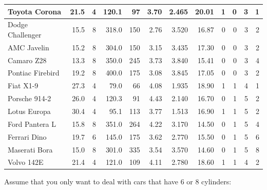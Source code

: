 \documentclass[
]{book}
\newenvironment{Shaded}{\begin{snugshade}}{\end{snugshade}}
\newcommand{\DecValTok}[1]{\textcolor[rgb]{0.00,0.00,0.81}{#1}}
\newcommand{\FunctionTok}[1]{\textcolor[rgb]{0.00,0.00,0.00}{#1}}
\newcommand{\NormalTok}[1]{#1}
\newcommand{\OtherTok}[1]{\textcolor[rgb]{0.56,0.35,0.01}{#1}}
\newcommand{\SpecialCharTok}[1]{\textcolor[rgb]{0.00,0.00,0.00}{#1}}
\theoremstyle{definition}
\theoremstyle{definition}
\theoremstyle{definition}
\theoremstyle{definition}
\theoremstyle{remark}
\begin{document}
\begin{tabular}{l|r|r|r|r|r|r|r|r|r|r|r}
\hline
Toyota Corona & 21.5 & 4 & 120.1 & 97 & 3.70 & 2.465 & 20.01 & 1 & 0 & 3 & 1\\
\hline
Dodge Challenger & 15.5 & 8 & 318.0 & 150 & 2.76 & 3.520 & 16.87 & 0 & 0 & 3 & 2\\
\hline
AMC Javelin & 15.2 & 8 & 304.0 & 150 & 3.15 & 3.435 & 17.30 & 0 & 0 & 3 & 2\\
\hline
Camaro Z28 & 13.3 & 8 & 350.0 & 245 & 3.73 & 3.840 & 15.41 & 0 & 0 & 3 & 4\\
\hline
Pontiac Firebird & 19.2 & 8 & 400.0 & 175 & 3.08 & 3.845 & 17.05 & 0 & 0 & 3 & 2\\
\hline
Fiat X1-9 & 27.3 & 4 & 79.0 & 66 & 4.08 & 1.935 & 18.90 & 1 & 1 & 4 & 1\\
\hline
Porsche 914-2 & 26.0 & 4 & 120.3 & 91 & 4.43 & 2.140 & 16.70 & 0 & 1 & 5 & 2\\
\hline
Lotus Europa & 30.4 & 4 & 95.1 & 113 & 3.77 & 1.513 & 16.90 & 1 & 1 & 5 & 2\\
\hline
Ford Pantera L & 15.8 & 8 & 351.0 & 264 & 4.22 & 3.170 & 14.50 & 0 & 1 & 5 & 4\\
\hline
Ferrari Dino & 19.7 & 6 & 145.0 & 175 & 3.62 & 2.770 & 15.50 & 0 & 1 & 5 & 6\\
\hline
Maserati Bora & 15.0 & 8 & 301.0 & 335 & 3.54 & 3.570 & 14.60 & 0 & 1 & 5 & 8\\
\hline
Volvo 142E & 21.4 & 4 & 121.0 & 109 & 4.11 & 2.780 & 18.60 & 1 & 1 & 4 & 2\\
\hline
\end{tabular}

Assume that you only want to deal with cars that have 6 or 8 cylinders:

\begin{Shaded}
\end{Shaded}
\end{document}
